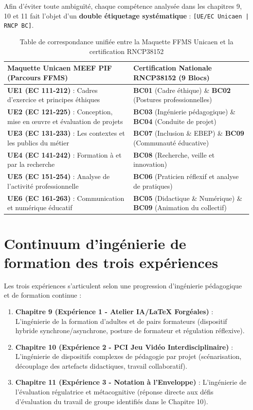 Afin d'éviter toute ambiguïté, chaque compétence analysée dans les chapitres 9, 10 et 11 fait l'objet d'un \textbf{double étiquetage systématique} : \texttt{[UE/EC Unicaen | RNCP BC]}.

\begin{table}[H]
\centering
\caption{Table de correspondance unifiée entre la Maquette FFMS Unicaen et la certification RNCP38152}
\label{tab-correspondance-referentiels}
\footnotesize
\begin{tabular}{|p{7.5cm}|p{7.5cm}|}
\hline
\textbf{Maquette Unicaen MEEF PIF (Parcours FFMS)} & \textbf{Certification Nationale RNCP38152 (9 Blocs)} \\
\hline
\textbf{UE1 (EC 111-212)} : Cadres d'exercice et principes éthiques & \textbf{BC01} (Cadre éthique) \& \textbf{BC02} (Postures professionnelles) \\
\hline
\textbf{UE2 (EC 121-225)} : Conception, mise en œuvre et évaluation de projets & \textbf{BC03} (Ingénierie pédagogique) \& \textbf{BC04} (Conduite de projet) \\
\hline
\textbf{UE3 (EC 131-233)} : Les contextes et les publics du métier & \textbf{BC07} (Inclusion \& EBEP) \& \textbf{BC09} (Communauté éducative) \\
\hline
\textbf{UE4 (EC 141-242)} : Formation à et par la recherche & \textbf{BC08} (Recherche, veille et innovation) \\
\hline
\textbf{UE5 (EC 151-254)} : Analyse de l'activité professionnelle & \textbf{BC06} (Praticien réflexif et analyse de pratiques) \\
\hline
\textbf{UE6 (EC 161-263)} : Communication et numérique éducatif & \textbf{BC05} (Didactique \& Numérique) \& \textbf{BC09} (Animation du collectif) \\
\hline
\end{tabular}
\end{table}

\section*{Continuum d'ingénierie de formation des trois expériences}

Les trois expériences s'articulent selon une progression d'ingénierie pédagogique et de formation continue :
\begin{enumerate}[leftmargin=*]
    \item \textbf{Chapitre 9 (Expérience 1 - Atelier IA/\LaTeX{} Forgéales)} : L'ingénierie de la formation d'adultes et de pairs formateurs (dispositif hybride synchrone/asynchrone, posture de formateur et régulation réflexive).
    \item \textbf{Chapitre 10 (Expérience 2 - PCI Jeu Vidéo Interdisciplinaire)} : L'ingénierie de dispositifs complexes de pédagogie par projet (scénarisation, découplage des artefacts didactiques, travail collaboratif).
    \item \textbf{Chapitre 11 (Expérience 3 - Notation à l'Enveloppe)} : L'ingénierie de l'évaluation régulatrice et métacognitive (réponse directe aux défis d'évaluation du travail de groupe identifiés dans le Chapitre 10).
\end{enumerate}
